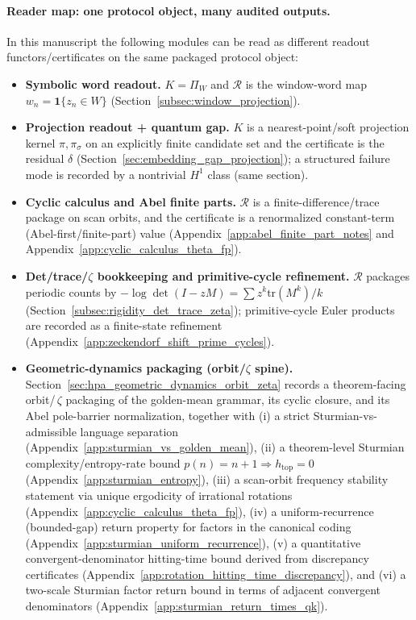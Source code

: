 \paragraph{Reader map: one protocol object, many audited outputs.}
\AuditTag In this manuscript the following modules can be read as different readout functors/certificates on the same packaged protocol object:
\begin{itemize}
\item \textbf{Symbolic word readout.} $K=\Pi_W$ and $\mathcal{R}$ is the window-word map $w_n=\mathbf{1}\{z_n\in W\}$ (Section~\ref{subsec:window_projection}).
\item \textbf{Projection readout + quantum gap.} $K$ is a nearest-point/soft projection kernel $\pi,\pi_\sigma$ on an explicitly finite candidate set and the certificate is the residual $\delta$ (Section~\ref{sec:embedding_gap_projection}); a structured failure mode is recorded by a nontrivial $H^1$ class (same section).
\item \textbf{Cyclic calculus and Abel finite parts.} $\mathcal{R}$ is a finite-difference/trace package on scan orbits, and the certificate is a renormalized constant-term (Abel-first/finite-part) value (Appendix~\ref{app:abel_finite_part_notes} and Appendix~\ref{app:cyclic_calculus_theta_fp}).
\item \textbf{Det/trace/\texorpdfstring{$\zeta$}{zeta} bookkeeping and primitive-cycle refinement.} $\mathcal{R}$ packages periodic counts by $-\log\det(I-zM)=\sum z^k\mathrm{tr}(M^k)/k$ (Section~\ref{subsec:rigidity_det_trace_zeta}); primitive-cycle Euler products are recorded as a finite-state refinement (Appendix~\ref{app:zeckendorf_shift_prime_cycles}).
\item \textbf{Geometric-dynamics packaging (orbit/\texorpdfstring{$\zeta$}{zeta} spine).} Section~\ref{sec:hpa_geometric_dynamics_orbit_zeta} records a theorem-facing orbit/\,$\zeta$ packaging of the golden-mean grammar, its cyclic closure, and its Abel pole-barrier normalization, together with (i) a strict Sturmian-vs-admissible language separation (Appendix~\ref{app:sturmian_vs_golden_mean}), (ii) a theorem-level Sturmian complexity/entropy-rate bound $p(n)=n+1\Rightarrow h_{\mathrm{top}}=0$ (Appendix~\ref{app:sturmian_entropy}), (iii) a scan-orbit frequency stability statement via unique ergodicity of irrational rotations (Appendix~\ref{app:cyclic_calculus_theta_fp}), (iv) a uniform-recurrence (bounded-gap) return property for factors in the canonical coding (Appendix~\ref{app:sturmian_uniform_recurrence}), (v) a quantitative convergent-denominator hitting-time bound derived from discrepancy certificates (Appendix~\ref{app:rotation_hitting_time_discrepancy}), and (vi) a two-scale Sturmian factor return bound in terms of adjacent convergent denominators (Appendix~\ref{app:sturmian_return_times_qk}).

\end{itemize}
